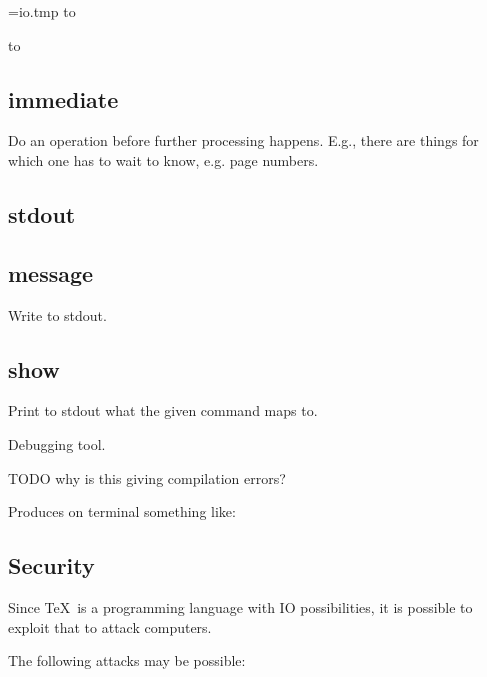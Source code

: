     \newread\file
    \immediate\openin\file=io.tmp
    \immediate\read\file to \fileline
    \fileline\par
    \eofhuman\file
    \immediate\read\file to \fileline
    \fileline\par
    \eofhuman\file
    \immediate\closein\file

  \subsection{immediate}

    Do an operation before further processing happens. E.g., there are things for which one has to wait to know, e.g. page numbers.

  \subsection{stdout}

  \subsection{message}

    Write to stdout.


  \subsection{show}

    Print to stdout what the given command maps to.

    Debugging tool.

    TODO why is this giving compilation errors?


    Produces on terminal something like:



  \subsection{Security}

    Since \TeX\ is a programming language with IO possibilities, it is possible to exploit that to attack computers.

    The following attacks may be possible:

